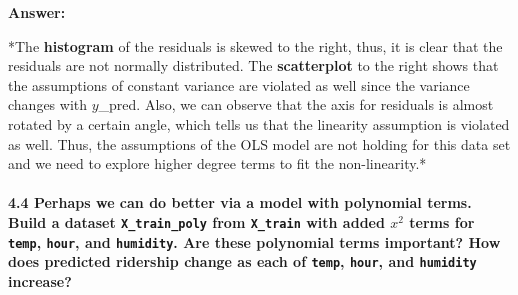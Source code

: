 \documentclass[11pt]{article}
\begin{document}
    \textbf{Answer:}

*The \textbf{histogram} of the residuals is skewed to the right, thus,
it is clear that the residuals are not normally distributed. The
\textbf{scatterplot} to the right shows that the assumptions of constant
variance are violated as well since the variance changes with
\(y\)\_pred. Also, we can observe that the axis for residuals is almost
rotated by a certain angle, which tells us that the linearity assumption
is violated as well. Thus, the assumptions of the OLS model are not
holding for this data set and we need to explore higher degree terms to
fit the non-linearity.*

    \paragraph{\texorpdfstring{\textbf{4.4} Perhaps we can do better via a
model with polynomial terms. Build a dataset \texttt{X\_train\_poly}
from \texttt{X\_train} with added \(x^2\) terms for \texttt{temp},
\texttt{hour}, and \texttt{humidity}. Are these polynomial terms
important? How does predicted ridership change as each of \texttt{temp},
\texttt{hour}, and \texttt{humidity}
increase?}{4.4 Perhaps we can do better via a model with polynomial terms. Build a dataset X\_train\_poly from X\_train with added x\^{}2 terms for temp, hour, and humidity. Are these polynomial terms important? How does predicted ridership change as each of temp, hour, and humidity increase?}}\label{perhaps-we-can-do-better-via-a-model-with-polynomial-terms.-build-a-dataset-x_train_poly-from-x_train-with-added-x2-terms-for-temp-hour-and-humidity.-are-these-polynomial-terms-important-how-does-predicted-ridership-change-as-each-of-temp-hour-and-humidity-increase}
\end{document}
